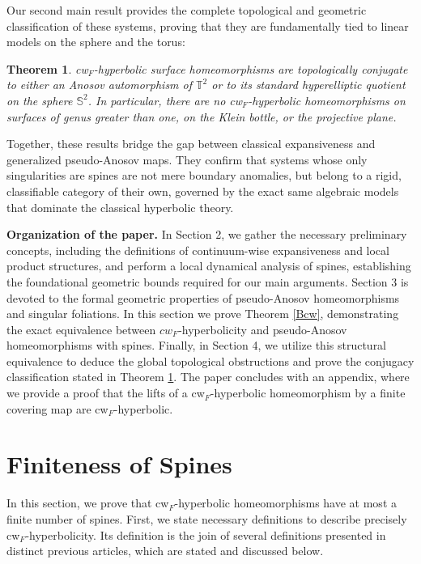 \documentclass{amsart}
\theoremstyle{plain}
\newtheorem{mainthm}{Theorem}
\theoremstyle{definition}
\begin{document}
Our second main result provides the complete topological and geometric classification of these systems, proving that they are fundamentally tied to linear models on the sphere and the torus:

\begin{mainthm}\label{A}
cw$_F$-hyperbolic surface homeomorphisms are topologically conjugate to either an Anosov automorphism of $\mathbb{T}^2$ or to  its standard hyperelliptic quotient on the sphere $\mathbb{S}^2$.
In particular, there are no cw$_F$-hyperbolic homeomorphisms on surfaces of genus greater than one, on the Klein bottle, or the projective plane.
\end{mainthm}

Together, these results bridge the gap between classical expansiveness and generalized pseudo-Anosov maps. They confirm that systems whose only singularities are spines are not mere boundary anomalies, but belong to a rigid, classifiable category of their own, governed by the exact same algebraic models that dominate the classical hyperbolic theory.

\vspace{0.3cm}
\noindent \textbf{Organization of the paper.}
In Section 2, we gather the necessary preliminary concepts, including the definitions of continuum-wise expansiveness and local product structures, and  perform a local dynamical analysis of spines, establishing the foundational geometric bounds required for our main arguments. Section 3 is devoted to the formal geometric properties of pseudo-Anosov homeomorphisms and singular foliations. In this section we prove Theorem \ref{Bcw}, demonstrating the exact equivalence between $cw_F$-hyperbolicity and pseudo-Anosov homeomorphisms with spines. Finally, in Section 4, we utilize this structural equivalence to deduce the global topological obstructions and prove the conjugacy classification stated in Theorem \ref{A}.  The paper concludes with an appendix, where we provide a proof that the lifts of a cw$_F$-hyperbolic homeomorphism by a finite covering map are cw$_F$-hyperbolic.

\section{Finiteness of Spines}


In this section, we prove that cw$_F$-hyperbolic homeomorphisms have at most a finite number of spines. First, we state necessary definitions to describe precisely cw$_F$-hyperbolicity. Its definition is the join of several definitions presented in distinct previous articles, which are stated and discussed below.
\end{document}
